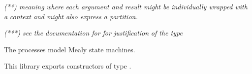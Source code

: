 \begin{haddockdesc}
 \emph{(**) meaning }  \emph{where}
 \emph{each argument and result might be individually wrapped with a}
 \emph{context and might also express a partition.}\par
 \emph{(***) see the documentation for \haddockid{-<-} for justification}
 \emph{of the type}\par
{}
 \par
The  processes model Mealy state machines.\par
This library exports constructors of type .\par

\end{haddockdesc}

